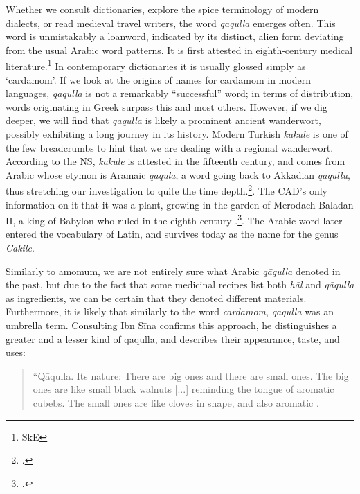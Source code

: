 

Whether we consult dictionaries, explore the spice terminology of modern dialects, or read medieval travel writers, the word  \textit{qāqulla} emerges often. This word is unmistakably a loanword, indicated by its distinct, alien form deviating from the usual Arabic word patterns. It is first attested in eighth-century medical literature.\footnote{SkE} In contemporary dictionaries it is usually glossed simply as `cardamom'. If we look at the origins of names for cardamom in modern languages, \textit{qāqulla} is not a remarkably ``successful'' word; in terms of distribution, words originating in Greek surpass this and most others. However, if we dig deeper, we will find that \textit{qāqulla} is likely a prominent ancient \gls{wanderwort}, possibly exhibiting a long journey in its history. Modern Turkish \textit{kakule} is one of the few breadcrumbs to hint that we are dealing with a regional \gls{wanderwort}. According to the \gls{NS}, \textit{kakule} is attested in the fifteenth century, and comes from Arabic whose etymon is Aramaic \textit{qāqūlā}, a word going back to Akkadian \textit{qāqullu}, thus stretching our investigation to quite the time depth.\footcite[kakule ]{ns}. The \gls{CAD}'s only information on it that it was a plant, growing in the garden of Merodach-Baladan II, a king of Babylon who ruled in the eighth century \BC{}.\footcite[Vol. 13, p. 124]{roth_assyrian_2004}. The Arabic word later entered the vocabulary of Latin, and survives today as the name for the genus \textit{Cakile}.

Similarly to amomum, we are not entirely sure what Arabic \textit{qāqulla} denoted in the past, but due to the fact that some medicinal recipes list both \textit{hāl} and \textit{qāqulla} as ingredients, we can be certain that they denoted different materials. Furthermore, it is likely that similarly to the word \textit{cardamom}, \textit{qaqulla} was an umbrella term. Consulting Ibn S\={i}na confirms this approach, he distinguishes a greater and a lesser kind of qaqulla, and describes their appearance, taste, and uses:

\begin{quote}
{\small``Q\={a}qulla. Its nature: There are big ones and there are small ones. The big ones are like small black walnuts [...] reminding the tongue of aromatic cubebs. The small ones are like cloves in shape, and also aromatic \autocite{ibn_sina_-qanun_1329}.}
\end{quote}

